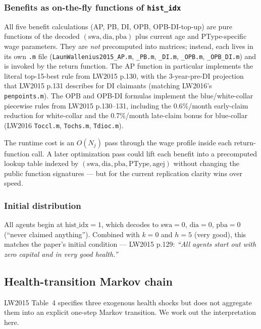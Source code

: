 \subsubsection{Benefits as on-the-fly functions of \texttt{hist\_idx}}

All five benefit calculations (AP, PB, DI, OPB, OPB-DI-top-up) are pure functions of the decoded $(\text{swa}, \text{dia}, \text{pba})$ plus current age and PType-specific wage parameters. They are \emph{not} precomputed into matrices; instead, each lives in its own \verb|.m| file (\verb|LaunWallenius2015_AP.m|, \verb|_PB.m|, \verb|_DI.m|, \verb|_OPB.m|, \verb|_OPB_DI.m|) and is invoked by the return function. The AP function in particular implements the literal top-15-best rule from LW2015 p.130, with the 3-year-pre-DI projection that LW2015 p.131 describes for DI claimants (matching LW2016's \verb|penpoints.m|). The OPB and OPB-DI formulas implement the blue/white-collar piecewise rules from LW2015 p.130--131, including the 0.6\%/month early-claim reduction for white-collar and the 0.7\%/month late-claim bonus for blue-collar (LW2016 \verb|Toccl.m|, \verb|Tochs.m|, \verb|Tdioc.m|).

The runtime cost is an $O(N_j)$ pass through the wage profile inside each return-function call. A later optimization pass could lift each benefit into a precomputed lookup table indexed by $(\text{swa}, \text{dia}, \text{pba}, \text{PType}, \text{agej})$ without changing the public function signatures --- but for the current replication clarity wins over speed.

\subsubsection{Initial distribution}

All agents begin at $\text{hist\_idx} = 1$, which decodes to $\text{swa} = 0$, $\text{dia} = 0$, $\text{pba} = 0$ (``never claimed anything''). Combined with $k = 0$ and $h = 5$ (very good), this matches the paper's initial condition --- LW2015 p.129: \emph{``All agents start out with zero capital and in very good health.''}


\subsection{Health-transition Markov chain}\label{sec:health}

LW2015 Table~4 specifies three exogenous health shocks but does not aggregate them into an explicit one-step Markov transition. We work out the interpretation here.

